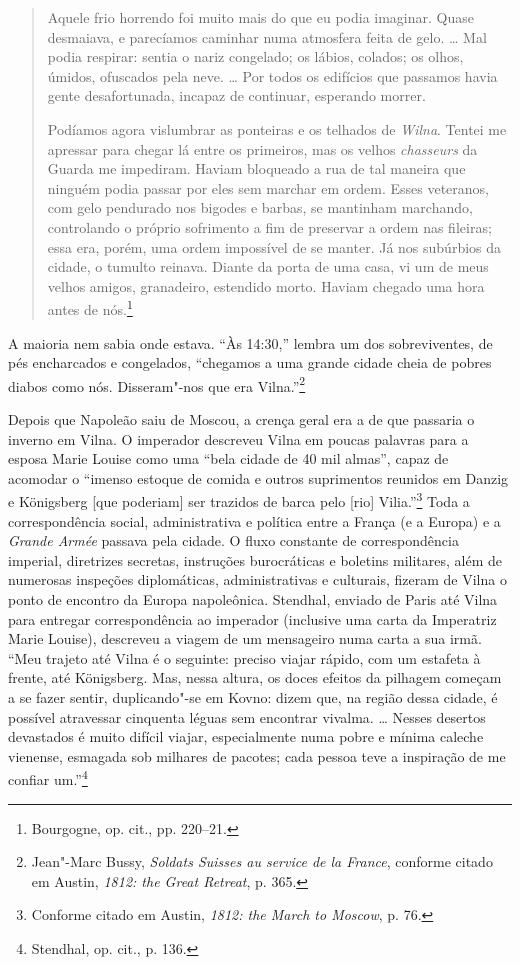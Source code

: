 \begin{quote}
Aquele frio horrendo foi muito mais do que eu podia imaginar. Quase
desmaiava, e parecíamos caminhar numa atmosfera feita de gelo. \ldots{}
Mal podia respirar: sentia o nariz congelado; os lábios, colados; os
olhos, úmidos, ofuscados pela neve. \ldots{} Por todos os edifícios que
passamos havia gente desafortunada, incapaz de continuar, esperando
morrer.

Podíamos agora vislumbrar as ponteiras e os telhados de \textit{Wilna}. Tentei me
apressar para chegar lá entre os primeiros, mas os velhos
\textit{chasseurs} da Guarda me impediram. Haviam bloqueado a rua de tal
maneira que ninguém podia passar por eles sem marchar em ordem. Esses
veteranos, com gelo pendurado nos bigodes e barbas, se mantinham
marchando, controlando o próprio sofrimento a fim de preservar a ordem
nas fileiras; essa era, porém, uma ordem impossível de se manter. Já nos
subúrbios da cidade, o tumulto reinava. Diante da porta de uma casa, vi
um de meus velhos amigos, granadeiro, estendido morto. Haviam chegado
uma hora antes de nós.\footnote{Bourgogne, op. cit., pp. 220--21.}
\end{quote}

A maioria nem sabia onde estava. ``Às 14:30,'' lembra um dos
sobreviventes, de pés encharcados e congelados, ``chegamos a uma grande
cidade cheia de pobres diabos como nós. Disseram"-nos que era
Vilna.''\footnote{Jean"-Marc Bussy, \textit{Soldats Suisses au service de la France}, conforme citado em Austin, \textit{1812: the Great Retreat}, p. 365.}

\asterisc

Depois que Napoleão saiu de Moscou, a crença geral era a de que passaria
o inverno em Vilna. O imperador descreveu Vilna em poucas palavras para
a esposa Marie Louise como uma ``bela cidade de 40 mil almas'', capaz de
acomodar o ``imenso estoque de comida e outros suprimentos reunidos em
Danzig e Königsberg {[}que poderiam{]} ser trazidos de barca pelo
{[}rio{]} Vilia.''\footnote{Conforme citado em Austin, \textit{1812: the March to Moscow}, p. 76.} Toda a correspondência social, administrativa e política entre a França (e a Europa) e a \textit{Grande
Armée} passava pela cidade. O fluxo constante de correspondência
imperial, diretrizes secretas, instruções burocráticas e boletins
militares, além de numerosas inspeções diplomáticas, administrativas e
culturais, fizeram de Vilna o ponto de encontro da Europa napoleônica.
Stendhal, enviado de Paris até Vilna para entregar correspondência ao
imperador (inclusive uma carta da Imperatriz Marie Louise), descreveu a
viagem de um mensageiro numa carta a sua irmã. ``Meu trajeto até Vilna é
o seguinte: preciso viajar rápido, com um estafeta à frente, até
Königsberg. Mas, nessa altura, os doces efeitos da pilhagem começam a se
fazer sentir, duplicando"-se em Kovno: dizem que, na região dessa cidade,
é possível atravessar cinquenta léguas sem encontrar vivalma. \ldots{}
Nesses desertos devastados é muito difícil viajar, especialmente numa
pobre e mínima caleche vienense, esmagada sob milhares de pacotes; cada
pessoa teve a inspiração de me confiar um.''\footnote{Stendhal, op. cit., p. 136.}

